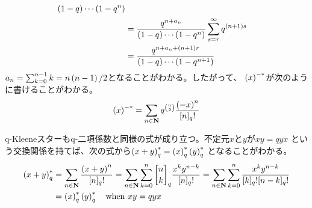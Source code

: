 {\begin{equation*}
\begin{split}
			{\mathinner{\left({1 - q}\right)}\cdots\mathinner{\left({1 - q^n}\right)}} \\
		&= \frac{q^{n + a_n}}{\mathinner{\left({1 - q}\right)}\cdots\mathinner{\left({1 - q^n}\right)}}
			\sum_{s=r}^\infty q^{\mathinner{\left({n+1}\right)}s} \\
		&= \frac{q^{n + a_n + \mathinner{\left({n+1}\right)}r}}{\mathinner{\left({1 - q}\right)}\cdots\mathinner{\left({1 - q^{n+1}}\right)}}
	\end{split}\end{equation*}
	$a_n=\sum_{k=0}^{n-1}k=n\mathinner{\left({n-1}\right)}/2$となることがわかる。したがって、
	$\mathinner{\left({x}\right)}^{-*}$が次のように書けることがわかる。
	\begin{equation*}\begin{split}
		\mathinner{\left({x}\right)}^{-*} = \sum_{n\in\mathbf{N}} q^{\binom{n}{2}}
			\frac{\mathinner{\left({-x}\right)}^n}{[n]_q!}
	\end{split}\end{equation*}

	q-Kleeneスターもq-二項係数と同様の式が成り立つ。不定元$x$と$y$が$xy=qyx$
	という交換関係を持てば、次の式から$\mathinner{\left({x+y}\right)}_q^*=\mathinner{\left({x}\right)}_q^*\mathinner{\left({y}\right)}_q^*$
	となることがわかる。
	\begin{equation*}\begin{split}
		\plr{x+y}_q^* &= \sum_{n\in\sizen} \frac{\plr{x+y}^n}{[n]_q!}
		= \sum_{n\in\sizen}\sum_{k=0}^n \qbinom{n}{k}_q\frac{x^ky^{n-k}}{[n]_q!}
		= \sum_{n\in\sizen}\sum_{k=0}^n \frac{x^ky^{n-k}}{[k]_q![n-k]_q!} \\
		&= \plr{x}_q^*\plr{y}_q^* \quad\text{when } xy = qyx
	\end{split}\end{equation*}

}
